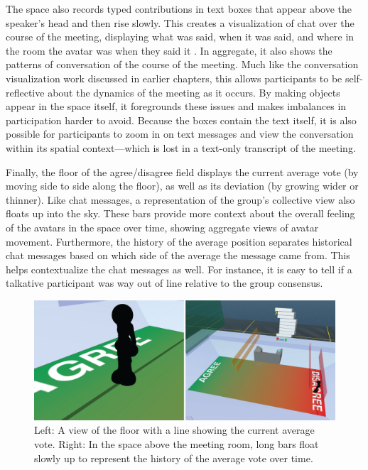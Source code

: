 The space also records typed contributions in text boxes that appear above the speaker's head and then rise slowly. This creates a visualization of chat over the course of the meeting, displaying what was said, when it was said, and where in the room the avatar was when they said it \citep{DiMicco:2007ie}. In aggregate, it also shows the patterns of conversation of the course of the meeting. Much like the conversation visualization work discussed in earlier chapters, this allows participants to be self-reflective about the dynamics of the meeting as it occurs. By making objects appear in the space itself, it foregrounds these issues and makes imbalances in participation harder to avoid. Because the boxes contain the text itself, it is also possible for participants to zoom in on text messages and view the conversation within its spatial context---which is lost in a text-only transcript of the meeting.

Finally, the floor of the agree/disagree field displays the current average vote (by moving side to side along the floor), as well as its deviation (by growing wider or thinner). Like chat messages, a representation of the group's collective view also floats up into the sky. These bars provide more context about the overall feeling of the avatars in the space over time, showing aggregate views of avatar movement. Furthermore, the history of the average position separates historical chat messages based on which side of the average the message came from. This helps contextualize the chat messages as well. For instance, it is easy to tell if a talkative participant was way out of line relative to the group consensus.

\begin{figure}[t]
	\includegraphics{figures/average+history.png}
	\caption{Left: A view of the floor with a line showing the current average vote. Right: In the space above the meeting room, long bars float slowly up to represent the history of the average vote over time.}
	\label{fig:information_space_average_history}
\end{figure}

